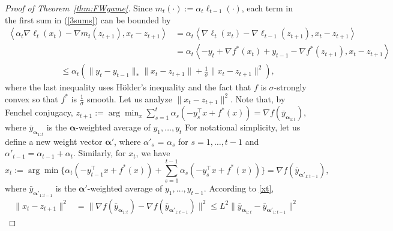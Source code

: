 \documentclass[pmlr]{jmlr} %
\def\balpha{\boldsymbol{\alpha}}
\newcommand{\lr}[2]{\left\langle#1,#2\right\rangle}
\newcommand{\pr}[1]{\left(#1\right)}
\begin{document}
\begin{proof}[Proof of Theorem~\ref{thm:FWgame}]
	Since $m_{t}(\cdot) := \alpha_{t} \ell_{t-1}(\cdot)$,
	each term in the first sum in (\ref{3sums}) can be bounded by
	\begin{equation*} 
	\begin{aligned}
\textstyle  \lr{\alpha_{t} \nabla \ell_{t}(x_{t}) - \nabla m_{t}(z_{t+1})}{x_{t} - z_{t+1}}
	 & \textstyle = \alpha_{t} \lr{ \nabla \ell_{t}(x_{t}) - \nabla \ell_{t-1}(z_{t+1})}{x_{t} - z_{t+1}}
	\\ & \textstyle = \alpha_{t} \lr{ - y_{t} + \nabla f^{*}(x_{t}) + y_{t-1} - \nabla f^{*}(z_{t+1}) }{x_{t} - z_{t+1}}
	\end{aligned}
	\end{equation*}\vspace{-8mm}
	\begin{align}
\textstyle	 \quad\quad&\leq \alpha_{t}  \pr{ \| y_{t} - y_{t-1} \|_{*} \| x_{t}- z_{t+1} \| + \frac{1}{\sigma} \| x_{t} - z_{t+1} \|^{2} },\label{tmp1}
	\end{align}
	where the last inequality uses  
	H\"older's inequality and 
	the fact that $f$ is $\sigma$-strongly convex
	so that $f^{*}$ is $\frac{1}{\sigma}$ smooth.
	Let us analyze $\| x_{t}- z_{t+1} \|^{2}$. Note that, by Fenchel conjugacy,
$\textstyle	z_{t+1} := \arg\min_{x} \sum_{s=1}^{t} \alpha_{s} ( -y_{s}^{\top} x + f^{*}(x)) = \nabla f(\bar{y}_{\balpha_{1:t}})$,
	where $\bar{y}_{\balpha_{1:t}}$ is the $\balpha$-weighted average of $y_{1}, \ldots, y_{t}$
	For notational simplicity, let us define a new weight vector $\balpha'$, where $\alpha'_{s}$ = $\alpha_{s}$ for $s = 1,\ldots,t-1$ and $\alpha'_{t-1} = \alpha_{t-1} + \alpha_{t}$. 
		Similarly, for $x_{t}$, we have 
	\begin{equation} \label{xt}
\textstyle	x_{t} := \arg\min \{ \alpha_{t} ( -y_{t-1}^{\top} x + f^{*}(x)) +  \sum_{s=1}^{t-1} \alpha_{s} ( -y_{s}^{\top} x + f^{*}(x)) \}  = \nabla f( \bar{y}_{\balpha'_{1:t-1}}),
	\end{equation}
	where $\bar{y}_{\balpha'_{1:t-1}}$ is the $\balpha'$-weighted average of $y_{1}, \ldots, y_{t-1}$.
	According to \eqref{xt}, 
	\begin{equation*}
	\begin{aligned}
\textstyle	\| x_{t}- z_{t+1} \|^{2}  & \textstyle = \| \nabla f(\bar{y}_{\balpha_{1:t}}) -  \nabla f(\bar{y}_{\balpha'_{1:t-1}}) \|^{2} 
	\leq L^{2} \| \bar{y}_{\balpha_{1:t}} -  \bar{y}_{\balpha'_{1:t-1}} \|^{2}

\end{aligned}
\end{equation*}
\end{proof}
\end{document}
